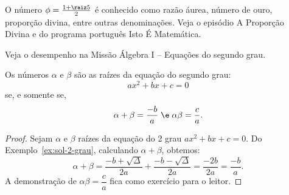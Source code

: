 \begin{remark}
    O número $\phi = \frac {1 + \raiz 5} 2$ é conhecido como razão áurea, número de ouro, proporção divina, entre outras denominações.
    Veja o episódio A Proporção Divina  e  do programa português Isto É Matemática.
\end{remark}

\begin{onlineact}
    Veja o desempenho na Missão Álgebra I -- Equações do segundo grau.
\end{onlineact}

\begin{theorem}
    Os números $\alpha$ e $\beta$ são as raízes da equação do segundo grau:
    \[
        ax^2 + bx + c = 0
    \]
    se, e somente se,
    \[
        \alpha + \beta = \dfrac {-b} a \; \e \; \alpha \beta = \dfrac c a.
    \]
\end{theorem}

\begin{proof}
    Sejam $\alpha$ e $\beta$ raízes da equação do 2\tdeg{} grau $ax^2 + bx + c = 0$. Do Exemplo~\ref{ex:sol-2-grau}, calculando $\alpha+\beta$, obtemos:
    \[
        \alpha+\beta = \dfrac{-b+\sqrt\Delta}{2a}+\dfrac{-b-\sqrt\Delta}{2a} = \dfrac{-2b}{2a}=\dfrac{-b}{a}.
    \]
    A demonstração de $\alpha\beta = \dfrac c a$ fica como exercício para o leitor.
\end{proof}
